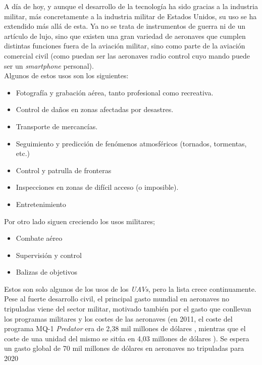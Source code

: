 A día de hoy, y aunque el desarrollo de la tecnología ha sido gracias a la industria militar, más concretamente a la industria militar de Estados Unidos, su uso se ha extendido más allá de esta. Ya no se trata de instrumentos de guerra ni de un artículo de lujo, sino que existen una gran variedad de aeronaves que cumplen distintas funciones fuera de la aviación militar, sino como parte de la aviación comercial civil (como puedan ser las aeronaves radio control cuyo mando puede ser un \emph{smartphone} personal).\\

Algunos de estos usos son los siguientes:
\begin{itemize}
	\item Fotografía y grabación aérea, tanto profesional como recreativa.
	\item Control de daños en zonas afectadas por desastres.
	\item Transporte de mercancías.
	\item Seguimiento y predicción de fenómenos atmosféricos (tornados, tormentas, etc.)
	\item Control y patrulla de fronteras
	\item Inspecciones en zonas de difícil acceso (o imposible).
	\item Entretenimiento
\end{itemize}

Por otro lado siguen creciendo los usos militares;
\begin{itemize}
	\item Combate aéreo
	\item Supervisión y control
	\item Balizas de objetivos
\end{itemize}
Estos son solo algunos de los usos de los \emph{UAVs}, pero la lista crece continuamente.\\

Pese al fuerte desarrollo civil, el principal gasto mundial en aeronaves no tripuladas viene del sector militar, motivado también por el gasto que conllevan los programas militares y los costes de las aeronaves (en 2011, el coste del programa MQ-1 \emph{Predator} era de 2,38 mil millones de dólares \citep{Predatorunitbudget}, mientras que el coste de una unidad del mismo se sitúa en 4,03 millones de dólares \citep{Predatorprogrambudget}). Se espera un gasto global de 70 mil millones de dólares en aeronaves no tripuladas para 2020 \citep{Goldman}\\

